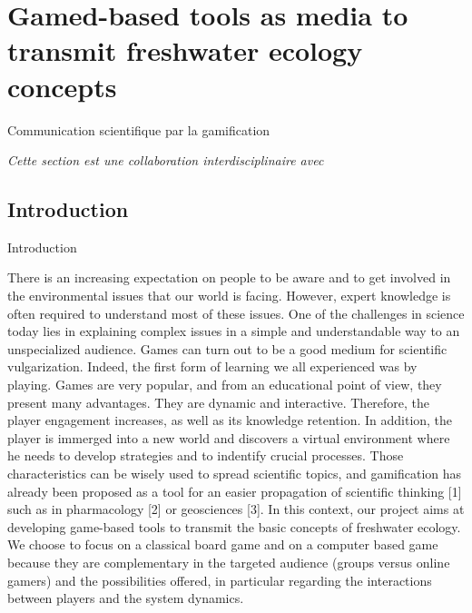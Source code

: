 


\newpage


\section{Gamed-based tools as media to transmit freshwater ecology concepts}{Communication scientifique par la gamification}

\label{app:sec:mediationecotox}





\stars

\textit{Cette section est une collaboration interdisciplinaire avec }


\stars



\subsection{Introduction}{Introduction}

There is an increasing expectation on people to be aware and to get involved in the environmental issues that our world is facing. However, expert knowledge is often required to understand most of these issues. One of the challenges in science today lies in explaining complex issues in a simple and understandable way to an unspecialized audience. Games can turn out to be a good medium for scientific vulgarization. Indeed, the first form of learning we all experienced was by playing. Games are very popular, and from an educational point of view, they present many advantages. They are dynamic and interactive. Therefore, the player engagement increases, as well as its knowledge retention. In addition, the player is immerged into a new world and discovers a virtual environment where he needs to develop strategies and to indentify crucial processes. Those characteristics can be wisely used to spread scientific topics, and gamification has already been proposed as a tool for an easier propagation of scientific thinking [1] such as in pharmacology [2] or geosciences [3]. In this context, our project aims at developing game-based tools to transmit the basic concepts of freshwater ecology. We choose to focus on a classical board game and on a computer based game because they are complementary in the targeted audience (groups versus online gamers) and the possibilities offered, in particular regarding the interactions between players and the system dynamics. 


